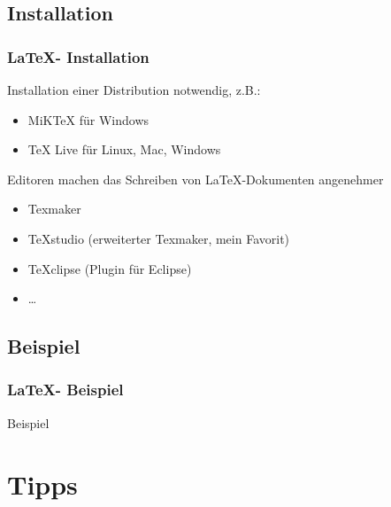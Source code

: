 \documentclass[18pt]{beamer}
\begin{document}
	\subsection{Installation}
	\begin{frame}
		\frametitle{\LaTeX - Installation}
		Installation einer Distribution notwendig, z.B.:
		\begin{itemize}
			\item  MiKTeX für Windows
			\item TeX Live für Linux, Mac, Windows
		\end{itemize}
		\pause
		Editoren machen das Schreiben von \LaTeX -Dokumenten angenehmer
		\begin{itemize}
			\item Texmaker
			\item TeXstudio (erweiterter Texmaker, mein Favorit)
			\item TeXclipse (Plugin für Eclipse)
			\item \dots
		\end{itemize}
	\end{frame}
	
	\subsection{Beispiel}
	\begin{frame}
		\frametitle{\LaTeX - Beispiel}
		\centering \huge Beispiel
	\end{frame}
		
\section{Tipps}
\end{document}
